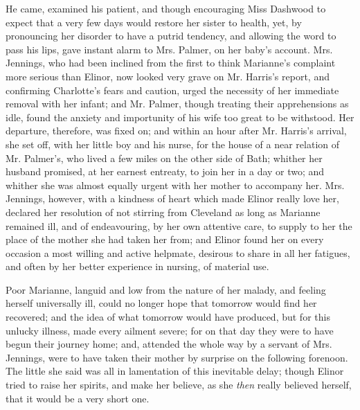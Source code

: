 He came, examined his patient, and though encouraging Miss Dashwood to expect that a very few days would restore her sister to health, yet, by pronouncing her disorder to have a putrid tendency, and allowing the word  to pass his lips, gave instant alarm to Mrs. Palmer, on her baby's account. Mrs. Jennings, who had been inclined from the first to think Marianne's complaint more serious than Elinor, now looked very grave on Mr. Harris's report, and confirming Charlotte's fears and caution, urged the necessity of her immediate removal with her infant; and Mr. Palmer, though treating their apprehensions as idle, found the anxiety and importunity of his wife too great to be withstood. Her departure, therefore, was fixed on; and within an hour after Mr. Harris's arrival, she set off, with her little boy and his nurse, for the house of a near relation of Mr. Palmer's, who lived a few miles on the other side of Bath; whither her husband promised, at her earnest entreaty, to join her in a day or two; and whither she was almost equally urgent with her mother to accompany her. Mrs. Jennings, however, with a kindness of heart which made Elinor really love her, declared her resolution of not stirring from Cleveland as long as Marianne remained ill, and of endeavouring, by her own attentive care, to supply to her the place of the mother she had taken her from; and Elinor found her on every occasion a most willing and active helpmate, desirous to share in all her fatigues, and often by her better experience in nursing, of material use.

Poor Marianne, languid and low from the nature of her malady, and feeling herself universally ill, could no longer hope that tomorrow would find her recovered; and the idea of what tomorrow would have produced, but for this unlucky illness, made every ailment severe; for on that day they were to have begun their journey home; and, attended the whole way by a servant of Mrs. Jennings, were to have taken their mother by surprise on the following forenoon. The little she said was all in lamentation of this inevitable delay; though Elinor tried to raise her spirits, and make her believe, as she {\em then} really believed herself, that it would be a very short one.

